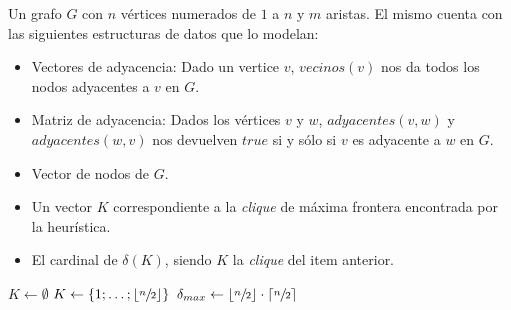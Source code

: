 \begin{pseudocodigo}
    \Require Un grafo $G$ con $n$ v\'ertices numerados de $1$ a $n$ y $m$ aristas. El mismo
        cuenta con las siguientes estructuras de datos que lo modelan:
        \begin{itemize}
            \item Vectores de adyacencia: Dado un vertice $v$, $vecinos(v)$ nos da todos los
                nodos adyacentes a $v$ en $G$.

            \item Matriz de adyacencia: Dados los v\'ertices $v$ y $w$, $adyacentes(v,w)$ y
                $adyacentes(w,v)$ nos devuelven $true$ si y s\'olo si $v$ es adyacente
                a $w$ en $G$.

            \item Vector de nodos de $G$.
        \end{itemize}
    \Ensure\Statex
        \begin{itemize}
            \item Un vector $K$ correspondiente a la \emph{clique} de m\'axima frontera
                encontrada por la heur\'istica.

            \item El cardinal de $\delta(K)$, siendo $K$ la \emph{clique} del item anterior.
        \end{itemize}
    \Statex

    \State $K \gets \emptyset$ 
     
        \State $K \gets \left\{1;\dots;\left\lfloor\sfrac{n}{2}\right\rfloor\right\}$ 
        \State $\delta_{max} \gets \left\lfloor\sfrac{n}{2}\right\rfloor\cdot
            \left\lceil\sfrac{n}{2}\right\rceil$ 
        \Statex

    \Else
    \EndIf {}

    \State {} 
    \Statex
    \Statex {}
\end{pseudocodigo}

\bigskip

\par
